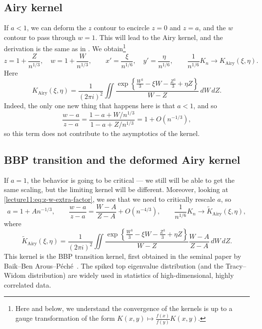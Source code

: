 \documentclass[letterpaper,11pt,oneside,reqno]{book}
\numberwithin{equation}{chapter}  %
\theoremstyle{definition}
\begin{document}
\subsection{Airy kernel}
	If $a<1$, we can deform the $z$ contour to encircle $z=0$ and $z=a$,
		and the $w$ contour to pass through $w=1$. This will lead to the Airy kernel,
		and the derivation is the same as in
		.
		We obtain\footnote{Here and below, we understand the convergence
			of the kernels is up to a gauge transformation of the form
		$K(x,y)\mapsto\frac{f(x)}{f(y)}K(x,y)$.}
		\begin{equation*}
			z=1+\frac{Z}{n^{1/3}},\quad w=1+\frac{W}{n^{1/3}},\qquad
			x'=\frac{\xi}{n^{1/6}}, \quad y'=\frac{\eta}{n^{1/6}},
			\qquad
			\frac{1}{n^{1/6}}K_n\to K_{\mathrm{Airy}}(\xi,\eta).
		\end{equation*}
		Here
		\[
			K_{\mathrm{Airy}}(\xi,\eta)=
			\frac{1}{(2\pi i)^2}\iint \frac{\exp\left\{ \frac{W^3}{3}-\xi W-\frac{Z^3}{3}+\eta Z \right\}}{W-Z}\,dW\,dZ.
		\]
		Indeed, the only one new thing that happens here is that $a<1$, and so
		\begin{equation}
			\label{lecture11:eq:z-w-extra-factor}
			\frac{w-a}{z-a}=\frac{1-a+W/n^{1/3}}{1-a+Z/n^{1/3}}=1+O(n^{-1/3}),
		\end{equation}
		so this term does not contribute to the asymptotics of the kernel.

\subsection{BBP transition and the deformed Airy kernel}

		If $a=1$, the behavior is going to be critical --- we still will
		be able to get the same scaling, but the limiting kernel will be different.
		Moreover, looking at \eqref{lecture11:eq:z-w-extra-factor}, we see that
		we need to critically rescale $a$, so
		\begin{equation*}
			a=1+A n^{-1/3},
			\qquad
			\frac{w-a}{z-a}=\frac{W-A}{Z-A}+O(n^{-4/3}),
			\qquad
			\frac{1}{n^{1/6}}K_n\to \tilde K_{\mathrm{Airy}}(\xi,\eta),
		\end{equation*}
		where
		\begin{equation*}
			\tilde K_{\mathrm{Airy}}(\xi,\eta)=
			\frac{1}{(2\pi i)^2}\iint \frac{\exp\left\{
			\frac{W^3}{3}-\xi W-\frac{Z^3}{3}+\eta Z
			\right\}}{W-Z}
			\frac{W-A}{Z-A}
			\,dW\,dZ.
		\end{equation*}
		This kernel is the BBP transition kernel,
		first obtained in the seminal paper by
		Baik--Ben Arous--P\'ech\'e~\cite{BBP2005phase}.
		The spiked top eigenvalue distribution (and the Tracy--Widom distribution)
		are widely used in statistics of high-dimensional,
		highly correlated data.
\end{document}
